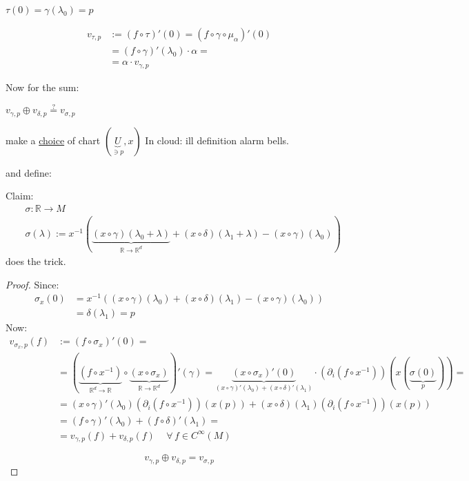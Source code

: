 $\tau(0) = \gamma(\lambda_0) =p$

\[
\begin{aligned}
  v_{\tau,p} & := (f\circ \tau)'(0) = (f\circ \gamma \circ \mu_{\alpha} )'(0) \\ 
  & =  (f\circ \gamma)'(\lambda_0) \cdot \alpha = \\
  & = \alpha \cdot v_{\gamma,p}
\end{aligned}
\]

Now for the sum: %

$v_{\gamma,p} \oplus v_{\delta,p} \overset{?}{=} v_{\sigma, p} $

make a \underline{choice} of chart $(\underbrace{U}_{\ni p} , x)$  In cloud: ill definition alarm bells. 

and define:

Claim:
\[
\begin{aligned}
  & \sigma : \mathbb{R} \to M \\
  & \sigma(\lambda) := x^{-1}( \underbrace{ (x\circ \gamma)(\lambda_0 + \lambda)}_{\mathbb{R} \to \mathbb{R}^d}  + (x\circ \delta)(\lambda_1+ \lambda) - (x\circ \gamma)(\lambda_0) )
\end{aligned}
\]
does the trick.
\begin{proof}
Since: 
\[
\begin{aligned}
  \sigma_x(0) & = x^{-1}((x\circ \gamma)(\lambda_0) + (x\circ \delta)(\lambda_1) - (x\circ \gamma)(\lambda_0)) \\
  & = \delta(\lambda_1) = p \end{aligned}
\]
Now:
\[
\begin{aligned}
  v_{\sigma_x,p}(f) & := (f\circ \sigma_x)'(0) =  \\ 
  & = ( \underbrace{ (f\circ x^{-1}) }_{\mathbb{R}^d \to \mathbb{R}}  \circ \underbrace{ (x\circ \sigma_x) }_{\mathbb{R} \to \mathbb{R}^d}  )'(\gamma) = \underbrace{ (x\circ \sigma_x)'(0) }_{(x\circ \gamma)'(\lambda_0) + (x\circ \delta)'(\lambda_1) } \cdot \left( \partial_i (f\circ x^{-1}) \right)(x( \underbrace{ \sigma(0)}_{p} ) ) = \\
  & = (x\circ \gamma)'(\lambda_0)(\partial_i (f\circ x^{-1}) )(x(p)) + (x\circ \delta)(\lambda_1)(\partial_i (f\circ x^{-1})  )(x(p)) \\
  & = (f\circ \gamma)'(\lambda_0) + (f\circ \delta)'(\lambda_1) = \\
  & = v_{\gamma,p}(f) + v_{\delta,p}(f) \quad \, \forall \, f \in C^{\infty}(M)
\end{aligned}
\]

\[
\boxed{ v_{\gamma,p} \oplus v_{\delta,p} = v_{\sigma, p} }
\]
\end{proof}

